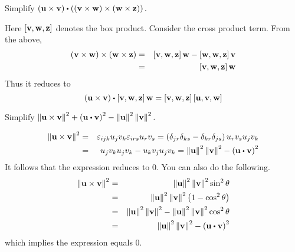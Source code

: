 \begin{enumialphparenastyle}
\begin{ex} Simplify $\tup{\vect{u}\times \vect{v}} \dotprod \tup{\tup{
\vect{v}\times \vect{w}} \times \tup{\vect{w}\times \vect{z}}} .$
\begin{sol}
Here $\left[\mbox{\bf v},\mbox{\bf w},\mbox{\bf z}\right]$ denotes the box product. Consider the cross product term. From the above,
\begin{eqnarray*}
\left(\mbox{\bf v}\times \mbox{\bf w}\right) \times \left(\mbox{\bf w}\times \mbox{\bf z}\right) &=& 
\left[\mbox{\bf v},\mbox{\bf w},\mbox{\bf z}\right] \mbox{\bf w}-\left[\mbox{\bf w},\mbox{\bf w},\mbox{\bf z}\right] \mbox{\bf v} \\
&=&\left[\mbox{\bf v},\mbox{\bf w},\mbox{\bf z}\right] \mbox{\bf w}
\end{eqnarray*}
Thus it reduces to
\[
\tup{\vect{u}\times \vect{v}} \dotprod \mat{\vect{v},\vect{w},\vect{z}} \vect{w}=\mat{\vect{v},\vect{w},\vect{z}} \mat{\vect{u},\vect{v},\vect{w}}
\]
\end{sol}
\end{ex}

\begin{ex} Simplify $\norm{\vect{u}\times \vect{v}} ^{2}+\tup{
\vect{u}\dotprod \vect{v}} ^{2}-\norm{\vect{u}} ^{2}\norm{
\vect{v}} ^{2}.$
\begin{sol}
\begin{eqnarray*}
\norm{\vect{u}\times \vect{v}} ^{2} &=&\varepsilon
_{ijk}u_{j}v_{k}\varepsilon _{irs}u_{r}v_{s}=\tup{\delta _{jr}\delta
_{ks}-\delta _{kr}\delta _{js}} u_{r}v_{s}u_{j}v_{k} \\
&=&u_{j}v_{k}u_{j}v_{k}-u_{k}v_{j}u_{j}v_{k}=\norm{\vect{u}
} ^{2}\norm{\vect{v}} ^{2}-\tup{\vect{u}\dotprod \vect{v}} ^{2}
\end{eqnarray*}
It follows that the expression reduces to $0$. You can also do the following.
\begin{eqnarray*}
\norm{\vect{u}\times \vect{v}} ^{2} &=&\norm{\vect{u}
} ^{2}\norm{\vect{v}} ^{2}\sin ^{2}\theta \\
&=&\norm{\vect{u}} ^{2}\norm{\vect{v}}
^{2}\tup{1-\cos ^{2}\theta } \\
&=&\norm{\vect{u}} ^{2}\norm{\vect{v}}
^{2}-\norm{\vect{u}} ^{2}\norm{\vect{v}}
^{2}\cos ^{2}\theta \\
&=&\norm{\vect{u}} ^{2}\norm{\vect{v}}
^{2}-\tup{\vect{u}\dotprod \vect{v}} ^{2}
\end{eqnarray*}
which implies the expression equals $0$.
\end{sol}
\end{ex}


\end{enumialphparenastyle}
